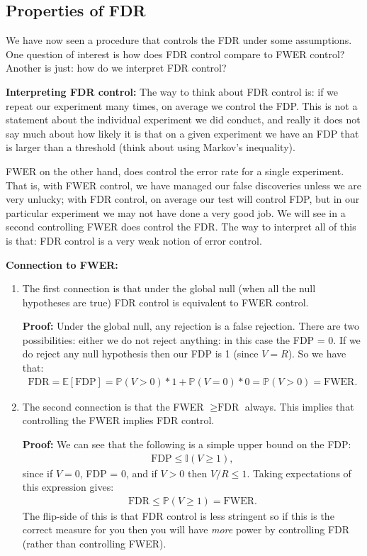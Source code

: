 \documentclass[twoside,12pt]{article}
\begin{document}
\subsection{Properties of FDR}
We have now seen a procedure that controls the FDR under some assumptions. One question of
interest is how does FDR control compare to FWER control? Another is just: how do we interpret FDR control?

{\bf Interpreting FDR control: } 
The way to think about FDR control is: if we repeat our experiment many times, on average we
control the FDP. This is not a statement about the individual experiment we did conduct, and
really it does not say much about how likely it is that on a given experiment we 
have an FDP that is larger than a threshold (think about using Markov's inequality). 

FWER on the other hand, does control the error rate for a single experiment. 
That is, with FWER control, we have managed our false discoveries unless we are
very unlucky; with FDR control, on average our test will control FDP, but in our particular experiment  we may not
have done a very good job. We will see in a second controlling FWER does control the FDR. The way to interpret all of this is that: FDR control is a very weak notion of error control.

{\bf Connection to FWER: } 
\begin{enumerate}
\item The first connection is that under the global null (when all the null hypotheses are true) FDR control is equivalent to FWER control.

{\bf Proof: } Under the global null, any rejection is a false rejection. 
There are two possibilities: either we do not reject anything: in this case the FDP = 0. If we do reject any null hypothesis then our FDP is 1 (since $V = R$). So we have that:
\begin{align*}
\text{FDR} = \mathbb{E}[\text{FDP}] = \mathbb{P}(V > 0)*1 + \mathbb{P}(V = 0)*0 = \mathbb{P}(V > 0)
= \text{FWER}.
\end{align*}

\item The second connection is that the FWER $\geq \text{FDR}$ always. This implies that controlling the FWER implies FDR control. 

{\bf Proof: } We can see that the following is a simple upper bound on the FDP:
\begin{align*}
\text{FDP} \leq \mathbb{I}(V \geq 1),
\end{align*}
since if $V = 0$, FDP = 0, and if $V > 0$ then $V/R \leq 1$. Taking expectations of this expression
gives:
\begin{align*}
\text{FDR} \leq \mathbb{P}(V \geq 1) = \text{FWER}.
\end{align*}
The flip-side of this is that FDR control is less stringent so if this is the correct measure for you then you will have \emph{more} power by controlling FDR (rather than controlling FWER).
\end{enumerate}
\end{document}

